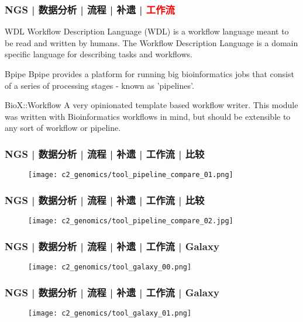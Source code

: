 \begin{frame}
  \frametitle{NGS | 数据分析 | 流程 | 补遗 | \textcolor{red}{工作流}}
  \begin{block}{WDL}
    Workflow Description Language (WDL) is a workflow language meant to be read and written by humans. The Workflow Description Language is a domain specific language for describing tasks and workflows.
  \end{block}
  \pause
  \begin{block}{Bpipe}
    Bpipe provides a platform for running big bioinformatics jobs that consist of a series of processing stages - known as 'pipelines'.
  \end{block}
  \pause
  \begin{block}{BioX::Workflow}
    A very opinionated template based workflow writer. This module was written with Bioinformatics workflows in mind, but should be extensible to any sort of workflow or pipeline.
  \end{block}
\end{frame}

\begin{frame}
  \frametitle{NGS | 数据分析 | 流程 | 补遗 | 工作流 | 比较}
  \begin{figure}
    \centering
    \texttt{[image: c2\_genomics/tool\_pipeline\_compare\_01.png]}
  \end{figure}
\end{frame}

\begin{frame}
  \frametitle{NGS | 数据分析 | 流程 | 补遗 | 工作流 | 比较}
  \begin{figure}
    \centering
    \texttt{[image: c2\_genomics/tool\_pipeline\_compare\_02.jpg]}
  \end{figure}
\end{frame}

\begin{frame}
  \frametitle{NGS | 数据分析 | 流程 | 补遗 | 工作流 | Galaxy}
  \begin{figure}
    \centering
    \texttt{[image: c2\_genomics/tool\_galaxy\_00.png]}
  \end{figure}
\end{frame}

\begin{frame}
  \frametitle{NGS | 数据分析 | 流程 | 补遗 | 工作流 | Galaxy}
  \begin{figure}
    \centering
    \texttt{[image: c2\_genomics/tool\_galaxy\_01.png]}
  \end{figure}
\end{frame}

